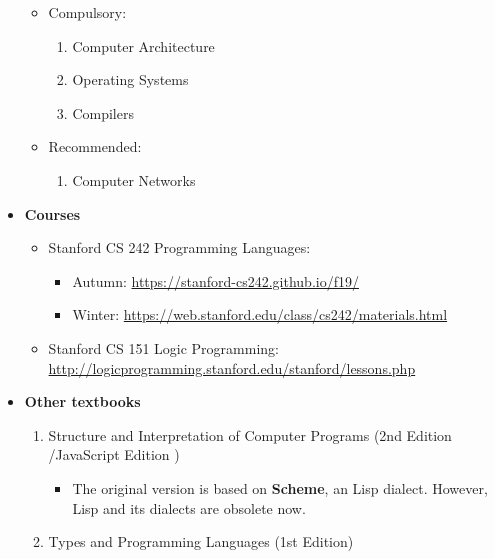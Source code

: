 \documentclass{article}
\begin{document}
\begin{itemize}
\begin{itemize}
        \item Compulsory:
        \begin{enumerate}
            \item Computer Architecture
            \item Operating Systems
            \item Compilers
        \end{enumerate}
        \item Recommended:
        \begin{enumerate}
            \item Computer Networks
        \end{enumerate}
    \end{itemize}
    \item \textbf{Courses}
        \begin{itemize}
            \item Stanford CS 242 Programming Languages:
            \begin{itemize}
                \item Autumn:
                \href{https://stanford-cs242.github.io/f19/}{https://stanford-cs242.github.io/f19/}
                \item Winter:
                \href{https://web.stanford.edu/class/cs242/materials.html}{https://web.stanford.edu/class/cs242/materials.html}
            \end{itemize}
            \item Stanford CS 151 Logic Programming:\\
            \href{http://logicprogramming.stanford.edu/stanford/lessons.php}{http://logicprogramming.stanford.edu/stanford/lessons.php}
        \end{itemize}
    \item \textbf{Other textbooks}
    \begin{enumerate}
        \item Structure and Interpretation of Computer Programs (2nd Edition \cite{abelson1996structure}/JavaScript Edition \cite{abelson2022structure})
        \begin{itemize}
            \item The original version is based on \textbf{Scheme}, an Lisp dialect.
            However, Lisp and its dialects are obsolete now.
        \end{itemize}
        \item Types and Programming Languages (1st Edition) \cite{pierce2002types}
    \end{enumerate}

\end{itemize}
\end{document}
